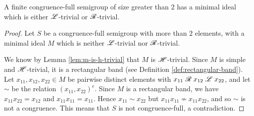 \begin{lemma}
  \label{lem:m-is-l-or-r-trivial}
  A finite congruence-full semigroup of size greater than $2$ has a minimal
  ideal which is either $\mathrel{\mathscr{L}}$-trivial or $\mathrel{\mathscr{R}}$-trivial.
  \begin{proof}
    Let $S$ be a congruence-full semigroup with more than $2$ elements, with a
    minimal ideal $M$ which is neither $\mathrel{\mathscr{L}}$-trivial nor $\mathrel{\mathscr{R}}$-trivial.

    We know by Lemma \ref{lem:m-is-h-trivial} that $M$ is $\mathrel{\mathscr{H}}$-trivial.
    Since $M$ is simple and $\mathrel{\mathscr{H}}$-trivial, it is a rectangular band (see
    Definition \ref{def:rectangular-band}).  Let
    $x_{11}, x_{12}, x_{22} \in M$ be pairwise distinct elements with
    $x_{11} \mathrel{\mathscr{R}} x_{12} \mathrel{\mathscr{L}} x_{22}$, and let $\sim$ be the relation
    $(x_{11},x_{22})^e$.  Since $M$ is a rectangular band, we have
    $x_{11}x_{22} = x_{12}$ and $x_{11}x_{11} = x_{11}$.  Hence
    $x_{11} \sim x_{22}$ but $x_{11}x_{11} \nsim x_{11}x_{22}$, and so $\sim$ is
    not a congruence.  This means that $S$ is not congruence-full, a
    contradiction.
  \end{proof}
\end{lemma}

